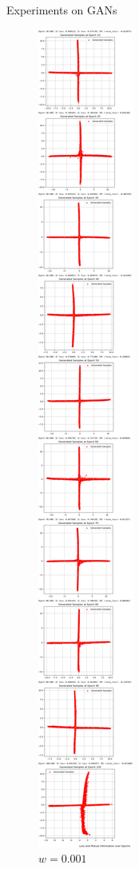 \documentclass[final]{beamer}
\newlength{\colwidth}
\begin{document}
\begin{frame}[t]
\begin{columns}[t]
\begin{column}{\colwidth}
\begin{block}{Experiments on GANs}
\begin{figure}
\begin{minipage}{0.19\textwidth}
    \caption{$w=0.01$}
    \end{minipage}
    \begin{minipage}{0.19\textwidth}
    \centering
    \includegraphics[width=1\linewidth]{gan_cross/Jietu20250101-003440@2x.png}
    \caption{$w=0.001$}
    \end{minipage}
    \end{figure}


\end{block}
\end{column}
\end{columns}
\end{frame}
\end{document}
